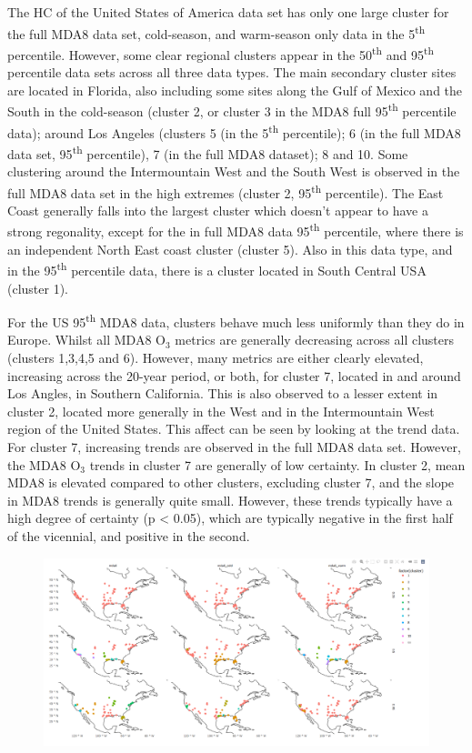 \documentclass[journal abbreviation, manuscript]{copernicus}
\begin{document}
The HC of the United States of America data set has only one large cluster for the full MDA8 data set, cold-season, and warm-season only data in the 5\textsuperscript{th} percentile. However, some clear regional clusters appear in the 50\textsuperscript{th} and 95\textsuperscript{th} percentile data sets across all three data types. The main secondary cluster sites are located in Florida, also including some sites along the Gulf of Mexico and the South in the cold-season (cluster 2, or cluster 3 in the MDA8 full 95\textsuperscript{th} percentile data); around Los Angeles (clusters 5 (in the 5\textsuperscript{th} percentile); 6 (in the full MDA8 data set, 95\textsuperscript{th} percentile), 7 (in the full MDA8 dataset); 8 and 10. Some clustering around the Intermountain West and the South West is observed in the full MDA8 data set in the high extremes (cluster 2, 95\textsuperscript{th} percentile). The East Coast generally falls into the largest cluster which doesn't appear to have a strong regonality, except for the in full MDA8 data 95\textsuperscript{th} percentile, where there is an independent North East coast cluster (cluster 5). Also in this data type, and in the 95\textsuperscript{th} percentile data, there is a cluster located in South Central USA (cluster 1).

For the US 95\textsuperscript{th} MDA8 data, clusters behave much less uniformly than they do in Europe. Whilst all MDA8 O$_3$ metrics are generally decreasing across all clusters (clusters 1,3,4,5 and 6). However, many metrics are either clearly elevated, increasing across the 20-year period, or both, for cluster 7, located in and around Los Angles, in Southern California. This is also observed to a lesser extent in cluster 2, located more generally in the West and in the Intermountain West region of the United States. This affect can be seen by looking at the trend data. For cluster 7, increasing trends are observed in the full MDA8 data set. However, the MDA8 O$_3$ trends in cluster 7 are generally of low certainty. In cluster 2, mean MDA8 is elevated compared to other clusters, excluding cluster 7, and the slope in MDA8 trends is generally quite small. However, these trends typically have a high degree of certainty (p < 0.05), which are typically negative in the first half of the vicennial, and positive in the second. 

\begin{figure}[h]
    \centering
    \includegraphics[width=1\linewidth]{figures//temporary_clusters/us_cluster.png}
\end{figure}
\end{document}
